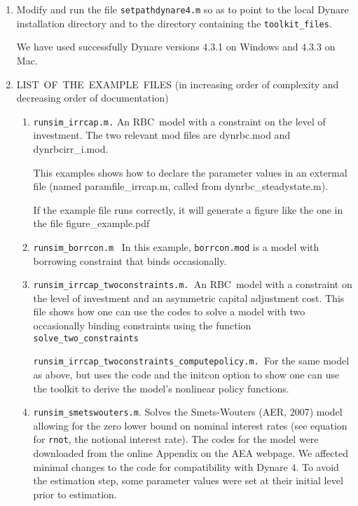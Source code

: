 \documentclass[12pt]{article}
\begin{document}
\begin{enumerate}
\item Modify and run the file \texttt{setpathdynare4.m} so as to point to
the local Dynare installation directory and to the directory containing the 
\texttt{toolkit\_files}.

We have used successfully Dynare versions 4.3.1 on Windows and 4.3.3 on Mac.

\item LIST\ OF\ THE\ EXAMPLE\ FILES (in increasing order of complexity and
decreasing order of documentation)

\begin{enumerate}
\item \texttt{runsim\_irrcap.m.} An RBC\ model with a
constraint on the level of investment. The two relevant mod files are dynrbc.mod and
dynrbcirr\_i.mod.

This examples shows how to declare the parameter values
in an extermal file (named paramfile\_irrcap.m, called from
dynrbc\_steadystate.m).

If the example file runs correctly, it will generate a figure like the one
in the file figure\_example.pdf

\item \texttt{runsim\_borrcon.m} \ In this example, \texttt{borrcon.mod} is
a model with borrowing constraint that binds occasionally.

\item \texttt{runsim\_irrcap\_twoconstraints.m. }An RBC\ model with
a constraint on the level of investment and an asymmetric capital adjustment
cost. This file shows how one can use the codes to solve a model with two
occasionally binding constraints using the function \texttt{%
solve\_two\_constraints}

\texttt{runsim\_irrcap\_twoconstraints\_computepolicy.m. }For the same model
as above, but uses the code and the initcon option to show one can use the
toolkit to derive the model's nonlinear policy functions.

\item \texttt{runsim\_smetswouters.m}. Solves the Smets-Wouters (AER, 2007)
model allowing for the zero lower bound on nominal interest rates (see equation for 
\texttt{rnot}, the notional interest rate). The codes for the model were
downloaded from the online Appendix on the AEA webpage. We affected minimal
changes to the code for compatibility with Dynare 4. To avoid the estimation
step, some parameter values were set at their initial level prior to
estimation.


\end{enumerate}
\end{enumerate}
\end{document}

